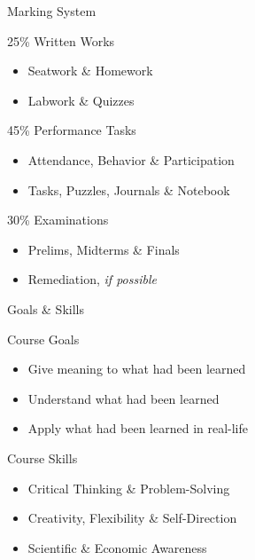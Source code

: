 \documentclass[14pt, aspectratio=169]{beamer}
\begin{document}
\begin{frame}{Marking System}
  \begin{block}{25\% Written Works}
   \begin{itemize}
    \item Seatwork \& Homework
    \item Labwork \& Quizzes
   \end{itemize}
  \end{block}

  \begin{block}{45\% Performance Tasks}
  \begin{itemize}
   \item Attendance, Behavior \& Participation
   \item Tasks, Puzzles, Journals \& Notebook
  \end{itemize}
  \end{block}

  \begin{block}{30\% Examinations}
   \begin{itemize}
    \item Prelims, Midterms \& Finals
    \item Remediation, \textit{if possible}
   \end{itemize}
  \end{block}
\end{frame}

\begin{frame}{Goals \& Skills}
 \begin{block}{Course Goals}
  \begin{itemize}
   \item Give meaning to what had been learned
   \item Understand what had been learned
   \item Apply what had been learned in real-life
  \end{itemize}
 \end{block}

 \begin{block}{Course Skills}
  \begin{itemize}
   \item Critical Thinking \& Problem-Solving
   \item Creativity, Flexibility \& Self-Direction
   \item Scientific \& Economic Awareness
  \end{itemize}
 \end{block}
\end{frame}
\end{document}
